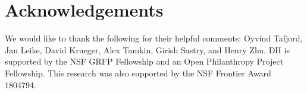 \newpage
\section*{Acknowledgements}
We would like to thank the following for their helpful comments: Oyvind Tafjord, Jan Leike, David Krueger, Alex Tamkin, Girish Sastry, and Henry Zhu. DH is supported by the NSF GRFP Fellowship and an Open Philanthropy Project Fellowship. This research was also supported by the NSF Frontier Award 1804794.

\newpage

\newpage

